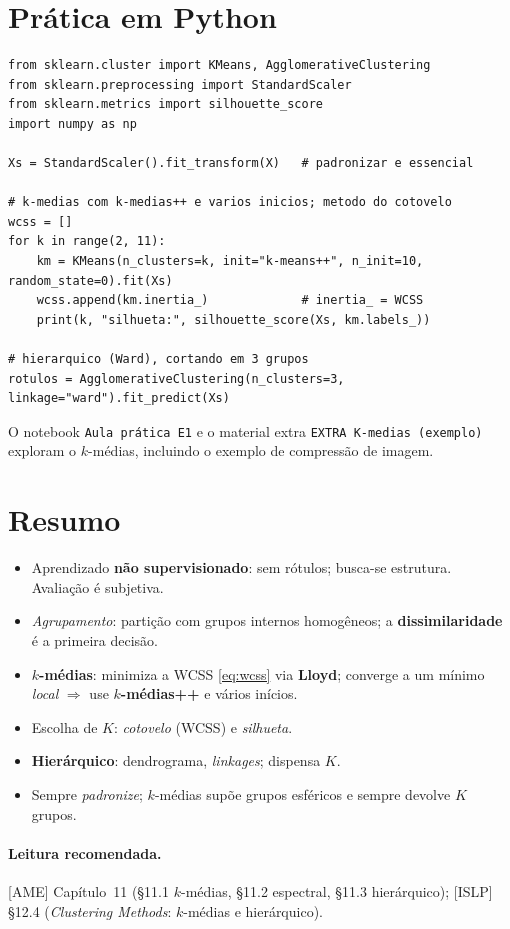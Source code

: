 \documentclass[11pt,a4paper]{article}
\begin{document}
\section{Prática em Python}
\begin{lstlisting}
from sklearn.cluster import KMeans, AgglomerativeClustering
from sklearn.preprocessing import StandardScaler
from sklearn.metrics import silhouette_score
import numpy as np

Xs = StandardScaler().fit_transform(X)   # padronizar e essencial

# k-medias com k-medias++ e varios inicios; metodo do cotovelo
wcss = []
for k in range(2, 11):
    km = KMeans(n_clusters=k, init="k-means++", n_init=10, random_state=0).fit(Xs)
    wcss.append(km.inertia_)             # inertia_ = WCSS
    print(k, "silhueta:", silhouette_score(Xs, km.labels_))

# hierarquico (Ward), cortando em 3 grupos
rotulos = AgglomerativeClustering(n_clusters=3, linkage="ward").fit_predict(Xs)
\end{lstlisting}
O notebook \texttt{Aula prática E1} e o material extra
\texttt{EXTRA K-medias (exemplo)} exploram o $k$-médias,
incluindo o exemplo de compressão de imagem.

\section*{Resumo}
\begin{itemize}[leftmargin=1.4cm]
  \item Aprendizado \textbf{não supervisionado}: sem rótulos; busca-se estrutura.
        Avaliação é subjetiva.
  \item \emph{Agrupamento}: partição com grupos internos homogêneos; a
        \textbf{dissimilaridade} é a primeira decisão.
  \item \textbf{$k$-médias}: minimiza a WCSS \eqref{eq:wcss} via \textbf{Lloyd};
        converge a um mínimo \emph{local} $\Rightarrow$ use \textbf{$k$-médias++} e
        vários inícios.
  \item Escolha de $K$: \emph{cotovelo} (WCSS) e \emph{silhueta}.
  \item \textbf{Hierárquico}: dendrograma, \emph{linkages}; dispensa $K$.
  \item Sempre \emph{padronize}; $k$-médias supõe grupos esféricos e sempre devolve
        $K$ grupos.
\end{itemize}

\paragraph{Leitura recomendada.} [AME] Capítulo~11 (§11.1 $k$-médias, §11.2
espectral, §11.3 hierárquico); [ISLP] §12.4 (\emph{Clustering Methods}: $k$-médias
e hierárquico).
\end{document}
